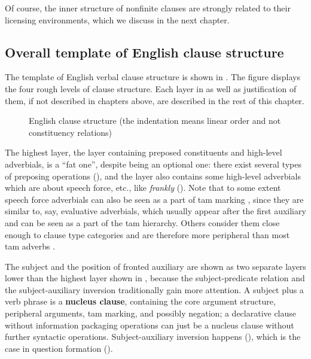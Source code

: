 \documentclass[UTF8, a4paper, oneside, scheme=plain, 12pt]{ctexbook}
\newcommand*{\citesec}[1]{\S~{#1}}
\newcommand*{\citepages}[1]{pp.~{#1}}
\newcommand*{\concept}[1]{\textbf{#1}}
\newcommand{\form}[1]{\emph{#1}}
\begin{document}
Of course, the inner structure of nonfinite clauses are strongly related to their licensing environments,
which we discuss in the next chapter.

\subsection{Overall template of English clause structure}\label{sec:clause-template}

The template of English verbal clause structure 
is shown in .
The figure displays the four rough levels of clause structure.
Each layer in  as well as justification of them,
if not described in chapters above, are described 
in the rest of this chapter.

\begin{figure}[H]
    \centering
    {\small }
    \caption{English clause structure (the indentation means linear order and not constituency relations)}
    \label{fig:clause-template}
\end{figure}

The highest layer, the layer containing preposed constituents and high-level adverbials, 
is a ``fat one'', despite being an optional one: there exist several types of preposing operations (),
and the layer also contains some high-level adverbials
which are about speech force, etc., %
like \form{frankly} ().
Note that to some extent speech force adverbials 
can also be seen as a part of \acs{tam} marking
\citep[\citesec{4.4}]{cinque1999adverbs},
since they are similar to, say, evaluative adverbials, 
which usually appear after the first auxiliary 
and can be seen as a part of the \acs{tam} hierarchy.
Others consider them close enough to clause type categories 
and are therefore more peripheral than most \acs{tam} adverbs 
\citep[\citepages{214-216}]{van2013clause}.

The subject and the position of fronted auxiliary
are shown as two separate layers lower than the highest layer shown in ,
because the subject-predicate relation 
and the subject-auxiliary inversion 
traditionally gain more attention.
A subject plus a verb phrase is a \concept{nucleus clause}, containing the core argument structure, peripheral arguments, \acs{tam} marking, and possibly negation;
a declarative clause without information packaging operations
can just be a nucleus clause without further syntactic operations.
Subject-auxiliary inversion happens (),
which is the case in %
question formation ().
\end{document}
